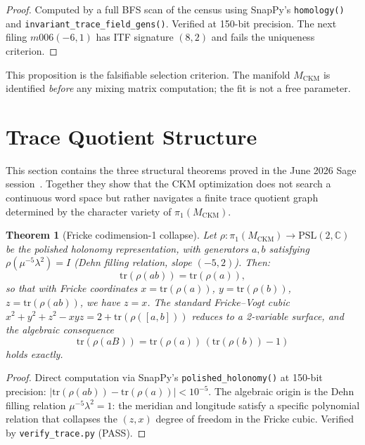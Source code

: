 \documentclass[11pt,a4paper]{article}
\newtheorem{theorem}{Theorem}
\theoremstyle{remark}
\newcommand{\MCKM}{M_{\mathrm{CKM}}}
\newcommand{\CC}{\mathbb{C}}
\newcommand{\PSL}{\mathrm{PSL}(2,\CC)}
\begin{document}
\begin{proof}
Computed by a full BFS scan of the census using SnapPy's
\texttt{homology()} and \texttt{invariant\_trace\_field\_gens()}.
Verified at 150-bit precision.
The next filing $m006(-6,1)$ has ITF signature $(8,2)$ and fails the
uniqueness criterion.
\end{proof}

This proposition is the falsifiable selection criterion.
The manifold $\MCKM$ is identified \emph{before} any mixing matrix
computation; the fit is not a free parameter.

\section{Trace Quotient Structure}
\label{sec:trace}

This section contains the three structural theorems proved in the
June 2026 Sage session~\cite{Gentry:arith}.
Together they show that the CKM optimization does not search a
continuous word space but rather navigates a finite trace quotient
graph determined by the character variety of $\pi_1(\MCKM)$.

\begin{theorem}[Fricke codimension-1 collapse]
\label{thm:fricke}
Let $\rho: \pi_1(\MCKM) \to \PSL$ be the polished holonomy
representation, with generators $a, b$ satisfying
$\rho(\mu^{-5} \lambda^2) = I$ (Dehn filling relation, slope $(-5,2)$).
Then:
\begin{equation}
\mathrm{tr}(\rho(ab)) = \mathrm{tr}(\rho(a)),
\label{eq:fricke}
\end{equation}
so that with Fricke coordinates $x = \mathrm{tr}(\rho(a))$,
$y = \mathrm{tr}(\rho(b))$, $z = \mathrm{tr}(\rho(ab))$,
we have $z = x$.
The standard Fricke--Vogt cubic
$x^2 + y^2 + z^2 - xyz = 2 + \mathrm{tr}(\rho([a,b]))$
reduces to a 2-variable surface, and the algebraic consequence
\begin{equation}
\mathrm{tr}(\rho(aB)) = \mathrm{tr}(\rho(a))\,(\mathrm{tr}(\rho(b)) - 1)
\label{eq:fv_reduced}
\end{equation}
holds exactly.
\end{theorem}

\begin{proof}
Direct computation via SnapPy's \texttt{polished\_holonomy()} at
150-bit precision: $|\mathrm{tr}(\rho(ab)) - \mathrm{tr}(\rho(a))| < 10^{-5}$.
The algebraic origin is the Dehn filling relation
$\mu^{-5}\lambda^2 = 1$: the meridian and longitude satisfy a
specific polynomial relation that collapses the $(z,x)$ degree of
freedom in the Fricke cubic.
Verified by \texttt{verify\_trace.py} (PASS).
\end{proof}
\end{document}

